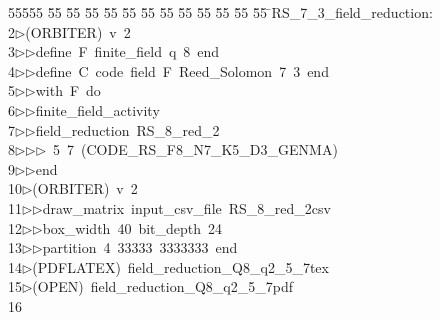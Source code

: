 %
%
\begin{tabbing}
55555 \= 55 \= 55 \= 55 \= 55 \= 55 \= 55 \= 55 \= 55 \= 55 \= 55 \= 55 \= 55 \= \>RS\_7\_3\_field\_reduction:\\[0pt]
2\>$\triangleright$\>(ORBITER)\ v\ 2\ \\[0pt]
3\>$\triangleright$\>$\triangleright$\>define\ F\ finite\_field\ q\ 8\ end\ \\[0pt]
4\>$\triangleright$\>$\triangleright$\>define\ C\ code\ field\ F\ Reed\_Solomon\ 7\ 3\ end\ \\[0pt]
5\>$\triangleright$\>$\triangleright$\>with\ F\ do\ \\[0pt]
6\>$\triangleright$\>$\triangleright$\>finite\_field\_activity\ \\[0pt]
7\>$\triangleright$\>$\triangleright$\>field\_reduction\ RS\_8\_red\_2\ \\[0pt]
8\>$\triangleright$\>$\triangleright$\>$\triangleright$\ 5\ 7\ (CODE\_RS\_F8\_N7\_K5\_D3\_GENMA)\ \\[0pt]
9\>$\triangleright$\>$\triangleright$\>end\\[0pt]
10\>$\triangleright$\>(ORBITER)\ v\ 2\ \\[0pt]
11\>$\triangleright$\>$\triangleright$\>draw\_matrix\ input\_csv\_file\ RS\_8\_red\_2csv\ \\[0pt]
12\>$\triangleright$\>$\triangleright$\>box\_width\ 40\ bit\_depth\ 24\ \\[0pt]
13\>$\triangleright$\>$\triangleright$\>partition\ 4\ 33333\ 3333333\ end\\[0pt]
14\>$\triangleright$\>(PDFLATEX)\ field\_reduction\_Q8\_q2\_5\_7tex\\[0pt]
15\>$\triangleright$\>(OPEN)\ field\_reduction\_Q8\_q2\_5\_7pdf\\[0pt]
16\>\end{tabbing}

